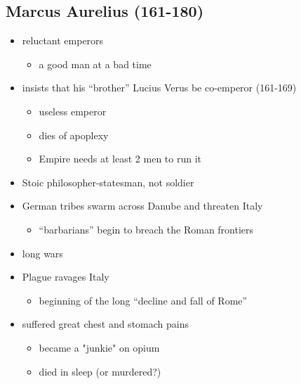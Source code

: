\documentclass[12pt, twoside]{article}
\begin{document}
\subsection{Marcus Aurelius (161-180)}
\begin{itemize}
\item reluctant emperors
	\begin{itemize}
	\item a good man at a bad time
	\end{itemize}
\item insists that his ``brother'' Lucius Verus be co-emperor (161-169)
	\begin{itemize}
	\item useless emperor
	\item dies of apoplexy
	\item Empire needs at least 2 men to run it
	\end{itemize}
\item Stoic philosopher-statesman, not soldier
\item German tribes swarm across Danube and threaten Italy
	\begin{itemize}
	\item ``barbarians'' begin to breach the Roman frontiers
	\end{itemize}
\item long wars
\item Plague ravages Italy
	\begin{itemize}
	\item beginning of the long “decline and fall of Rome”
	\end{itemize}
\item suffered great chest and stomach pains
	\begin{itemize}
	\item became a "junkie" on opium
	\item died in sleep (or murdered?)
	\end{itemize}
\end{itemize}
\end{document}
